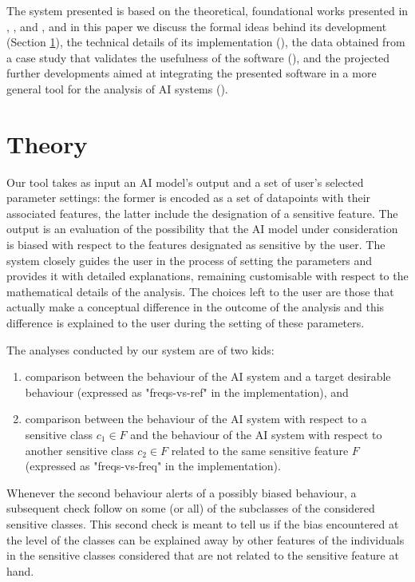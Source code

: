 \documentclass[
]{ceurart}
\begin{document}
The system presented is based on the theoretical, foundational works presented in \cite{dap21}, \cite{dagp22}, and \cite{gp23}, and in this paper we discuss the formal ideas behind its development (Section \ref{sec:theory}), the technical details of its implementation  (), the data obtained from a case study that validates the usefulness of the software (), and the projected further developments aimed at integrating the presented software in a more general tool for the analysis of AI systems ().

\section{Theory}\label{sec:theory}

Our tool takes as input an AI model's output and a set of user's selected parameter settings: the former is encoded as a set of datapoints with their associated features, the latter include the designation of a sensitive feature. The output is an evaluation of the possibility that the AI model under consideration is biased with respect to the features designated as sensitive by the user. The system closely guides the user in the process of setting the parameters and provides it with detailed explanations, remaining customisable with respect to the mathematical details of the analysis. The choices left to the user are those that actually make a conceptual difference in the outcome of the analysis and this difference is explained to the user during the setting of these parameters.

The analyses conducted by our system are of two kids: 

\begin{enumerate}
	\item comparison between the behaviour of the AI system and a target desirable behaviour (expressed as "freqs-vs-ref" in the implementation), and
	
	\item comparison between the behaviour of the AI system with respect to a sensitive class $c_1\in F$ and the behaviour of the AI system with respect to another sensitive class $c_2\in F$ related to the same sensitive feature $F$ (expressed as "freqs-vs-freq" in the implementation).
\end{enumerate}

Whenever the second behaviour alerts of a possibly biased behaviour, a subsequent check follow on some (or all) of the subclasses of the considered sensitive classes. This second check is meant to tell us if the bias encountered at the level of the classes can be explained away by other features of the individuals in the sensitive classes considered that are not related to the sensitive feature at hand.
\end{document}
